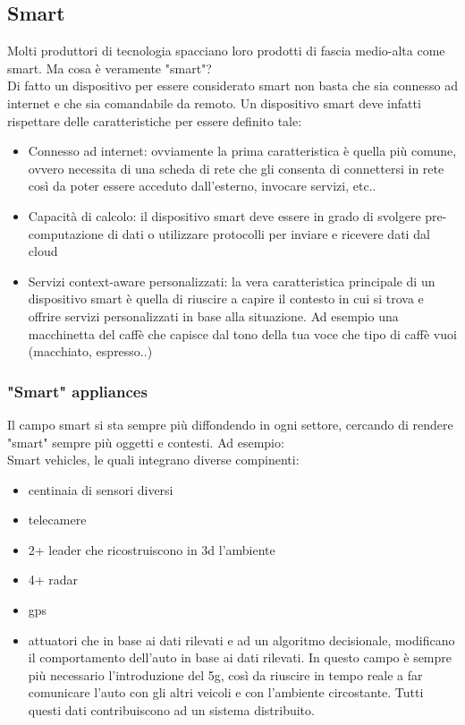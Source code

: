 \subsection{Smart}
Molti produttori di tecnologia spacciano loro prodotti di fascia medio-alta come smart. Ma cosa è veramente "smart"?\\
Di fatto un dispositivo per essere considerato smart non basta che sia connesso ad internet e che sia comandabile da remoto. Un dispositivo smart deve infatti rispettare delle caratteristiche per essere definito tale:
\begin{itemize}
    \item Connesso ad internet: ovviamente la prima caratteristica è quella più comune, ovvero necessita di una scheda di rete che gli consenta di connettersi in rete così da poter essere acceduto dall'esterno, invocare servizi, etc..
    \item Capacità di calcolo: il dispositivo smart deve essere in grado di svolgere pre-computazione di dati o utilizzare protocolli per inviare e ricevere dati dal cloud
    \item Servizi context-aware personalizzati: la vera caratteristica principale di un dispositivo smart è quella di riuscire a capire il contesto in cui si trova e offrire servizi personalizzati in base alla situazione. Ad esempio una macchinetta del caffè che capisce dal tono della tua voce che tipo di caffè vuoi (macchiato, espresso..)
\end{itemize}

\subsubsection{"Smart" appliances}
Il campo smart si sta sempre più diffondendo in ogni settore, cercando di rendere "smart" sempre più oggetti e contesti. Ad esempio:\\ 

Smart vehicles, le quali integrano diverse compinenti:
\begin{itemize}
    \item centinaia di sensori diversi
    \item telecamere
    \item 2+ leader che ricostruiscono in 3d l'ambiente
    \item 4+ radar
    \item gps
    \item attuatori che in base ai dati rilevati e ad un algoritmo decisionale, modificano il comportamento dell'auto in base ai dati rilevati. In questo campo è sempre più necessario l'introduzione del 5g, così da riuscire in tempo reale a far comunicare l'auto con gli altri veicoli e con l'ambiente circostante. Tutti questi dati contribuiscono ad un sistema distribuito.
\end{itemize}
\phantom \\

